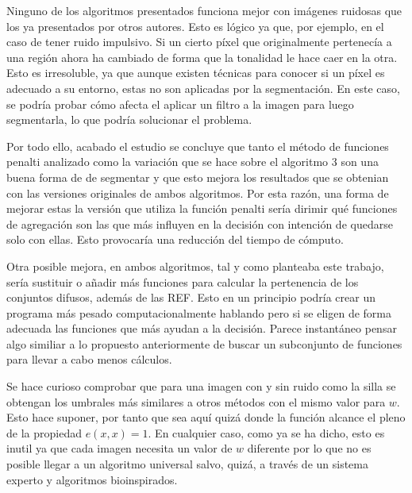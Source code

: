 Ninguno de los algoritmos presentados funciona mejor con imágenes ruidosas que los ya presentados por otros autores. Esto es lógico ya que, por ejemplo, en el caso de tener ruido impulsivo. Si un cierto píxel que originalmente pertenecía a una región ahora ha cambiado de forma que la tonalidad le hace caer en la otra. Esto es irresoluble, ya que aunque existen técnicas para conocer si un píxel es adecuado a su entorno, estas no son aplicadas por la segmentación. En este caso, se podría probar cómo afecta el aplicar un filtro a la imagen para luego segmentarla, lo que podría solucionar el problema.


Por todo ello, acabado el estudio se concluye que tanto el método de funciones penalti analizado como la variación que se hace sobre el algoritmo 3 son una buena forma de de segmentar y que esto mejora los resultados que se obtenian con las versiones originales de ambos algoritmos. Por esta razón, una forma de mejorar estas la versión que utiliza la función penalti sería dirimir qué funciones de agregación son las que más influyen en la decisión con intención de quedarse solo con ellas. Esto provocaría una reducción del tiempo de cómputo.

Otra posible mejora, en ambos algoritmos, tal y como planteaba este trabajo, sería sustituir o añadir más funciones para calcular la pertenencia de los conjuntos difusos, además de las REF. Esto en un principio podría crear un programa más pesado computacionalmente hablando pero si se eligen de forma adecuada las funciones que más ayudan a la decisión. Parece instantáneo pensar algo similiar a lo propuesto anteriormente de buscar un subconjunto de funciones para llevar a cabo menos cálculos.

Se hace curioso comprobar que para una imagen con y sin ruido como la silla se obtengan los umbrales más similares a otros métodos con el mismo valor para $w$. Esto hace suponer, por tanto que sea aquí quizá donde la función alcance el pleno de la propiedad $e(x,x)=1$. En cualquier caso, como ya se ha dicho, esto es inutil ya que cada imagen necesita un valor de $w$ diferente por lo que no es posible llegar a un algoritmo universal salvo, quizá, a través de un sistema experto y algoritmos bioinspirados.


